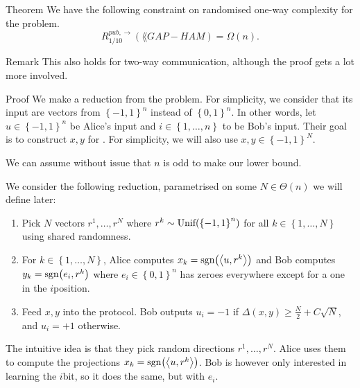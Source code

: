 \documentclass[a4paper]{article}
\begin{document}
\begin{parag}{Theorem}
    We have the following constraint on randomised one-way complexity for the  problem.
    \[R_{1/10}^{pub, \to}\left(\lang{GAP-HAM}\right) = \Omega\left(n\right).\]

    \begin{subparag}{Remark}
        This also holds for two-way communication, although the proof gets a lot more involved.
    \end{subparag}

    \begin{subparag}{Proof}
        We make a reduction from the  problem. For simplicity, we consider that its input are vectors from $\left\{-1, 1\right\}^n$ instead of $\left\{0, 1\right\}^n$. In other words, let $u \in \left\{-1, 1\right\}^n$ be Alice's input and $i \in \left\{1, \ldots, n\right\}$ to be Bob's input. Their goal is to construct $x, y$ for . For simplicity, we will also use $x, y \in \left\{-1, 1\right\}^N$.  

        We can assume without issue that $n$ is odd to make our lower bound.

        We consider the following reduction, parametrised on some $N \in \Theta\left(n\right)$ we will define later:
        \begin{enumerate}[left=0pt]
            \item Pick $N$ vectors $r^1, \ldots, r^N$ where $r^k \followsdistr \text{Unif}\left(\left\{-1, 1\right\}^n\right)$ for all $k \in \left\{1, \ldots, N\right\}$ using shared randomness.
            \item For $k \in \left\{1, \ldots, N\right\}$, Alice computes $x_k = \sgn\left(\left\langle u, r^k \right\rangle\right)$ and Bob computes $y_k = \sgn\left(e_i, r^k\right)$ where $e_i \in \left\{0, 1\right\}^n$ has zeroes everywhere except for a one in the $i$\Th position.
            \item Feed $x, y$ into the  protocol. Bob outputs $u_i = -1$ if $\Delta\left(x, y\right) \geq \frac{N}{2} + C\sqrt{N}$, and $u_i = +1$ otherwise.
        \end{enumerate}

        The intuitive idea is that they pick random directions $r^1, \ldots, r^N$. Alice uses them to compute the projections $x_k = \sgn\left(\left\langle u, r^k \right\rangle\right)$. Bob is however only interested in learning the $i$\Th bit, so it does the same, but with $e_i$.


\end{subparag}
\end{parag}
\end{document}
